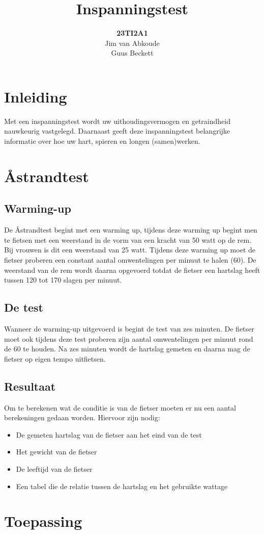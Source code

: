 \documentclass[]{article}
\begin{document}
\title{Inspanningstest}

\author{\textbf{23TI2A1}\\Jim van Abkoude\\Guus Beckett }
\maketitle
\newpage
\tableofcontents
\newpage
\section{Inleiding}
Met een inspanningstest wordt uw uithoudingsvermogen en getraindheid   nauwkeurig vastgelegd. Daarnaast geeft deze inspanningstest belangrijke informatie over hoe uw hart, spieren en longen (samen)werken.
\newpage
\section{\r{A}strandtest}
\subsection{Warming-up}
De \r{A}strandtest begint met een warming up, tijdens deze warming up begint men te fietsen met een weerstand in de vorm van een kracht van 50 watt op de rem. Bij vrouwen is dit een weerstand van 25 watt. Tijdens deze warming up moet de fietser proberen een constant aantal omwentelingen per minuut te halen (60). De weerstand van de rem wordt daarna opgevoerd totdat de fietser een hartslag heeft tussen 120 tot 170 slagen per minuut.
\subsection{De test}
Wanneer de warming-up uitgevoerd is begint de test van zes minuten. De fietser moet ook tijdens deze test proberen zijn aantal omwentelingen per minuut rond de 60 te houden. Na zes minuten wordt de hartslag gemeten en daarna mag de fietser op eigen tempo uitfietsen.
\subsection{Resultaat}
Om te berekenen wat de conditie is van de fietser moeten er nu een aantal berekeningen gedaan worden. Hiervoor zijn nodig:
\begin{itemize}
\item De gemeten hartslag van de fietser aan het eind van de test
\item Het gewicht van de fietser
\item De leeftijd van de fietser
\item Een tabel die de relatie tussen de hartslag en het gebruikte wattage
\end{itemize}
\newpage
\section{Toepassing}
\newpage
\end{document}
